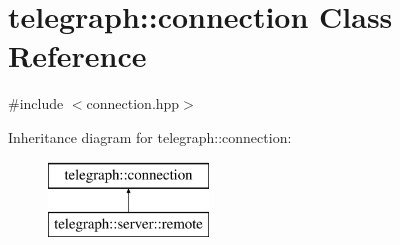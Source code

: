 \hypertarget{classtelegraph_1_1connection}{}\section{telegraph\+:\+:connection Class Reference}
\label{classtelegraph_1_1connection}


{\ttfamily \#include $<$connection.\+hpp$>$}

Inheritance diagram for telegraph\+:\+:connection\+:\begin{figure}[H]
\begin{center}
\leavevmode
\includegraphics[height=2.000000cm]{classtelegraph_1_1connection}
\end{center}
\end{figure}
